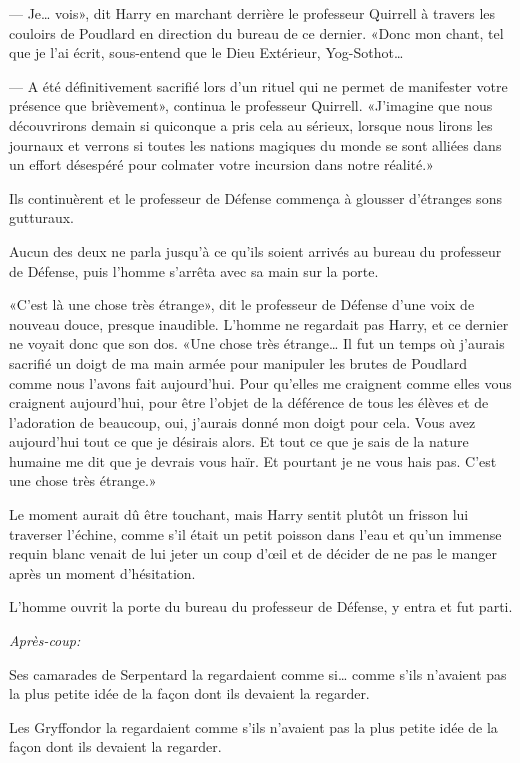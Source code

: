 --- Je… vois», dit Harry en marchant derrière le professeur Quirrell à travers les couloirs de Poudlard en direction du bureau de ce dernier. «Donc mon chant, tel que je l'ai écrit, sous-entend que le Dieu Extérieur, Yog-Sothot…

--- A été définitivement sacrifié lors d'un rituel qui ne permet de manifester votre présence que brièvement», continua le professeur Quirrell. «J'imagine que nous découvrirons demain si quiconque a pris cela au sérieux, lorsque nous lirons les journaux et verrons si toutes les nations magiques du monde se sont alliées dans un effort désespéré pour colmater votre incursion dans notre réalité.»

Ils continuèrent et le professeur de Défense commença à glousser d'étranges sons gutturaux.

Aucun des deux ne parla jusqu'à ce qu'ils soient arrivés au bureau du professeur de Défense, puis l'homme s'arrêta avec sa main sur la porte.

«C'est là une chose très étrange», dit le professeur de Défense d'une voix de nouveau douce, presque inaudible. L'homme ne regardait pas Harry, et ce dernier ne voyait donc que son dos. «Une chose très étrange… Il fut un temps où j'aurais sacrifié un doigt de ma main armée pour manipuler les brutes de Poudlard comme nous l'avons fait aujourd'hui. Pour qu'elles me craignent comme elles vous craignent aujourd'hui, pour être l'objet de la déférence de tous les élèves et de l'adoration de beaucoup, oui, j'aurais donné mon doigt pour cela. Vous avez aujourd'hui tout ce que je désirais alors. Et tout ce que je sais de la nature humaine me dit que je devrais vous haïr. Et pourtant je ne vous hais pas. C'est une chose très étrange.»

Le moment aurait dû être touchant, mais Harry sentit plutôt un frisson lui traverser l'échine, comme s'il était un petit poisson dans l'eau et qu'un immense requin blanc venait de lui jeter un coup d'œil et de décider de ne pas le manger après un moment d'hésitation.

L'homme ouvrit la porte du bureau du professeur de Défense, y entra et fut parti.

\later

\emph{Après-coup:}

Ses camarades de Serpentard la regardaient comme si… comme s'ils n'avaient pas la plus petite idée de la façon dont ils devaient la regarder.

Les Gryffondor la regardaient comme s'ils n'avaient pas la plus petite idée de la façon dont ils devaient la regarder.

